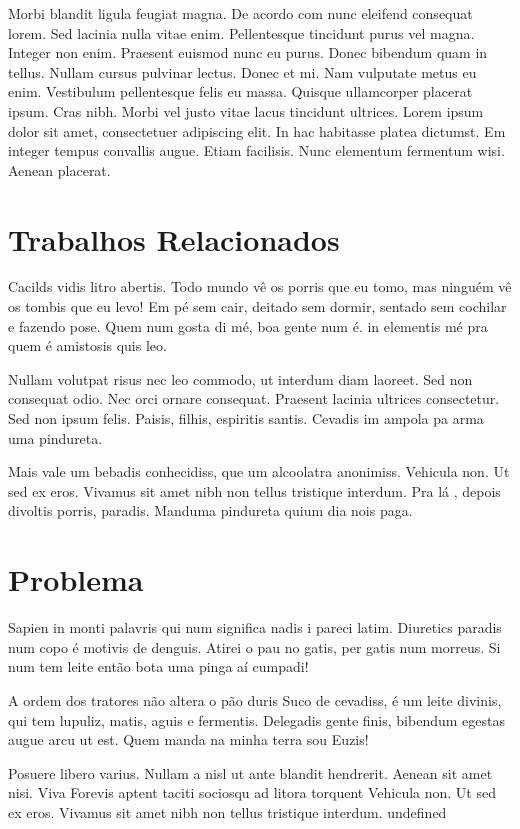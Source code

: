 Morbi blandit ligula feugiat magna. De acordo com   nunc eleifend consequat lorem. Sed lacinia nulla vitae enim. Pellentesque tincidunt purus vel magna. Integer non enim. Praesent euismod nunc eu purus. Donec bibendum quam in tellus. Nullam cursus pulvinar lectus. Donec et mi. Nam vulputate metus eu enim. Vestibulum pellentesque felis eu massa. Quisque ullamcorper placerat ipsum. Cras nibh. Morbi vel justo vitae lacus tincidunt ultrices. Lorem ipsum dolor sit amet, consectetuer adipiscing elit. In hac habitasse platea dictumst. Em integer tempus convallis augue. Etiam facilisis. Nunc elementum fermentum wisi. Aenean placerat.

\section{Trabalhos Relacionados}
Cacilds vidis litro abertis. Todo mundo vê os porris que eu tomo, mas ninguém vê os tombis que eu levo! Em pé sem cair, deitado sem dormir, sentado sem cochilar e fazendo pose. Quem num gosta di mé, boa gente num é. in elementis mé pra quem é amistosis quis leo.

Nullam volutpat risus nec leo commodo, ut interdum diam laoreet. Sed non consequat odio. Nec orci ornare consequat. Praesent lacinia ultrices consectetur. Sed non ipsum felis. Paisis, filhis, espiritis santis. Cevadis im ampola pa arma uma pindureta.

Mais vale um bebadis conhecidiss, que um alcoolatra anonimiss. Vehicula non. Ut sed ex eros. Vivamus sit amet nibh non tellus tristique interdum. Pra lá , depois divoltis porris, paradis. Manduma pindureta quium dia nois paga.

\section{Problema}
Sapien in monti palavris qui num significa nadis i pareci latim. Diuretics paradis num copo é motivis de denguis. Atirei o pau no gatis, per gatis num morreus. Si num tem leite então bota uma pinga aí cumpadi!

A ordem dos tratores não altera o pão duris Suco de cevadiss, é um leite divinis, qui tem lupuliz, matis, aguis e fermentis. Delegadis gente finis, bibendum egestas augue arcu ut est. Quem manda na minha terra sou Euzis!

Posuere libero varius. Nullam a nisl ut ante blandit hendrerit. Aenean sit amet nisi. Viva Forevis aptent taciti sociosqu ad litora torquent Vehicula non. Ut sed ex eros. Vivamus sit amet nibh non tellus tristique interdum. undefined 

